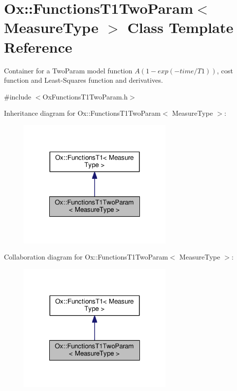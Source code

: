 \hypertarget{class_ox_1_1_functions_t1_two_param}{\section{Ox\-:\-:Functions\-T1\-Two\-Param$<$ Measure\-Type $>$ Class Template Reference}
\label{class_ox_1_1_functions_t1_two_param}
}


Container for a Two\-Param model function $ A(1 - exp( -time / T1 )) $, cost function and Least-\/\-Squares function and derivatives.  




{\ttfamily \#include $<$Ox\-Functions\-T1\-Two\-Param.\-h$>$}



Inheritance diagram for Ox\-:\-:Functions\-T1\-Two\-Param$<$ Measure\-Type $>$\-:
\nopagebreak
\begin{figure}[H]
\begin{center}
\leavevmode
\includegraphics[width=216pt]{class_ox_1_1_functions_t1_two_param__inherit__graph}
\end{center}
\end{figure}


Collaboration diagram for Ox\-:\-:Functions\-T1\-Two\-Param$<$ Measure\-Type $>$\-:
\nopagebreak
\begin{figure}[H]
\begin{center}
\leavevmode
\includegraphics[width=216pt]{class_ox_1_1_functions_t1_two_param__coll__graph}
\end{center}
\end{figure}
